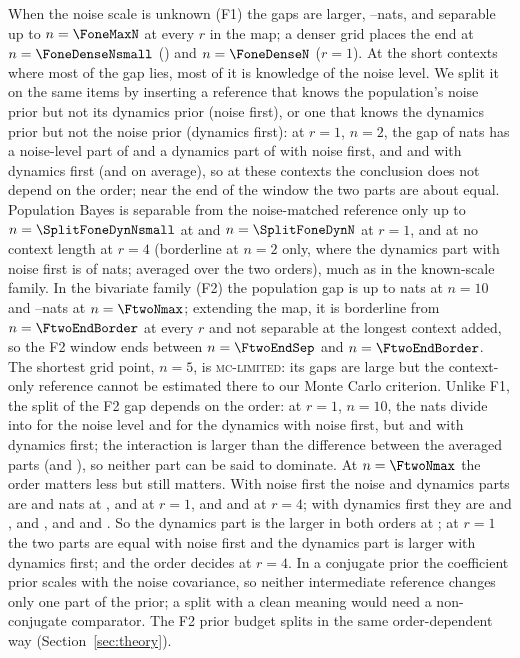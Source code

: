 When the noise scale is unknown (F1) the gaps are larger, \FoneGapMin--\FoneGapMax nats, and separable up to $n=\FoneMaxN$ at
every $r$ in the map; a denser grid places the end at $n=\FoneDenseNsmall$ (\rsmall) and $n=\FoneDenseN$ ($r=1$). At the short
contexts where most of the gap lies, most of it is knowledge of the noise level. We split it on the same items by inserting a reference that knows the population's noise
prior but not its dynamics prior (noise first), or one that knows the dynamics prior but not the noise prior (dynamics
first): at $r=1$, $n=2$, the gap of \SplitFoneT nats has a noise-level part of \PathFoneNone and a dynamics part of
\PathFoneDone with noise first, and \PathFoneNtwo and \PathFoneDtwo with dynamics first (\SplitFoneN and \SplitFoneD on
average), so at these contexts the conclusion does not depend on the order; near the end of the window the two parts are
about equal. Population Bayes is separable from the noise-matched reference only up to $n=\SplitFoneDynNsmall$ at \rsmall
and $n=\SplitFoneDynN$ at $r=1$, and at no context length at $r=4$ (borderline at $n=2$ only, where the dynamics part with
noise first is \PathFoneDoneFour of \SplitFoneTfour nats; \SplitFoneDfour averaged over the two orders), much as in the
known-scale family. In the bivariate family (F2) the population gap is up to \FtwoGapMax nats at $n=10$ and
\FtwoGapMin--\FtwoGapLongMax nats at $n=\FtwoNmax$; extending the map, it is borderline from $n=\FtwoEndBorder$ at every $r$
and not separable at the longest context added, so the F2 window ends between $n=\FtwoEndSep$ and $n=\FtwoEndBorder$. The
shortest grid point, $n=5$, is \textsc{mc-limited}: its gaps are large but the context-only reference cannot be estimated
there to our Monte Carlo criterion. Unlike F1, the split of the F2 gap depends on the order: at $r=1$, $n=10$, the
\SplitFtwoT nats divide into \PathFtwoNone for the noise level and \PathFtwoDone for the dynamics with noise first, but
\PathFtwoNtwo and \PathFtwoDtwo with dynamics first; the interaction is larger than the difference between the averaged parts
(\SplitFtwoN and \SplitFtwoD), so neither part can be said to dominate. At $n=\FtwoNmax$ the order matters less but still matters.
With noise first the noise and dynamics parts are \PathTwentySmallNone and \PathTwentySmallDone nats at \rsmall,
\PathTwentyOneNone and \PathTwentyOneDone at $r=1$, and \PathTwentyFourNone and \PathTwentyFourDone at $r=4$; with dynamics
first they are \PathTwentySmallNtwo and \PathTwentySmallDtwo, \PathTwentyOneNtwo and \PathTwentyOneDtwo, and
\PathTwentyFourNtwo and \PathTwentyFourDtwo. So the dynamics part is the larger in both orders at \rsmall; at $r=1$ the two
parts are equal with noise first and the dynamics part is larger with dynamics first; and the order decides at $r=4$. In a
conjugate prior the coefficient prior scales with the noise covariance, so neither intermediate reference changes only one
part of the prior; a split with a clean meaning would need a non-conjugate comparator. The F2 prior budget splits in the same
order-dependent way (Section~\ref{sec:theory}).

